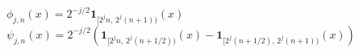 \documentclass[10pt]{book}
\begin{document}
\begin{preview}
\begin{minipage}{\textwidth}\centering
\begin{minipage}{.9\linewidth}\centering
$\displaystyle\phi_{j,n}(x)=2^{-j/2}\mathbf1_{[2^jn,\,2^j(n+1))}(x)$\\[1em]
$\displaystyle\psi_{j,n}(x)=2^{-j/2}\left(\mathbf1_{[2^jn,\,2^j(n+1/2))}(x)-\mathbf1_{[2^j(n+1/2),\,2^j(n+1))}(x)\right)$
\end{minipage}
\end{minipage}
\end{preview}
\end{document}
